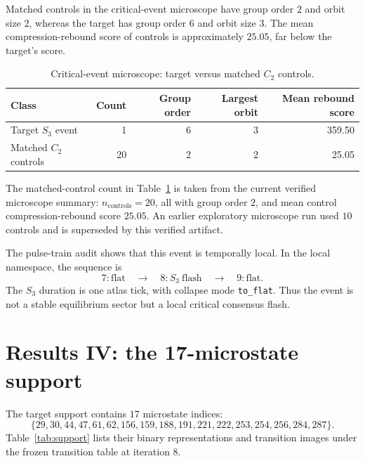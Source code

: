 \documentclass[11pt]{article}
\begin{document}
Matched controls in the critical-event microscope have group order $2$ and orbit size $2$, whereas the target has group order $6$ and orbit size $3$.  The mean compression-rebound score of controls is approximately $25.05$, far below the target's score.

\begin{table}[h]
\centering
\caption{Critical-event microscope: target versus matched $C_2$ controls.}
\begin{tabular}{lrrrr}
\toprule
Class & Count & Group order & Largest orbit & Mean rebound score \\
\midrule
Target $S_3$ event & 1 & 6 & 3 & 359.50 \\
Matched $C_2$ controls & 20 & 2 & 2 & 25.05 \\
\bottomrule
\end{tabular}
\label{tab:microscope}
\end{table}

The matched-control count in Table~\ref{tab:microscope} is taken from the current verified microscope summary: $n_{\mathrm{controls}}=20$, all with group order $2$, and mean control compression-rebound score $25.05$.  An earlier exploratory microscope run used $10$ controls and is superseded by this verified artifact.

The pulse-train audit shows that this event is temporally local.  In the local namespace, the sequence is
\[
7:\mathrm{flat}\quad\to\quad 8:S_3\mathrm{\ flash}\quad\to\quad 9:\mathrm{flat}.
\]
The $S_3$ duration is one atlas tick, with collapse mode \texttt{to\_flat}.  Thus the event is not a stable equilibrium sector but a local critical consensus flash.

\section{Results IV: the 17-microstate support}

The target support contains $17$ microstate indices:
\[
\{29,30,44,47,61,62,156,159,188,191,221,222,253,254,256,284,287\}.
\]
Table~\ref{tab:support} lists their binary representations and transition images under the frozen transition table at iteration $8$.
\end{document}
